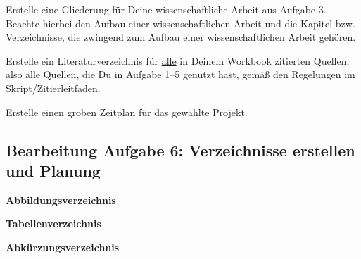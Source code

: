 
\begin{enumerate}[leftmargin=*]
	\itshape{
	\item Erstelle eine Gliederung für Deine wissenschaftliche Arbeit aus Aufgabe 3. Beachte hierbei den Aufbau
	      einer wissenschaftlichen Arbeit und die Kapitel bzw. Verzeichnisse, die zwingend zum Aufbau einer
	      wissenschaftlichen Arbeit gehören.
	\item Erstelle ein Literaturverzeichnis für \uline{alle} in Deinem Workbook zitierten Quellen, also alle Quellen, die Du
	      in Aufgabe 1–5 genutzt hast, gemäß den Regelungen im Skript/Zitierleitfaden.
	\item Erstelle einen groben Zeitplan für das gewählte Projekt.
	      }
\end{enumerate}

\clearpage

\subsection*{Bearbeitung Aufgabe 6: Verzeichnisse erstellen und Planung}

\noindent\textbf{Abbildungsverzeichnis}
\par\noindent\textbf{Tabellenverzeichnis}
\par\noindent\textbf{Abkürzungsverzeichnis}

